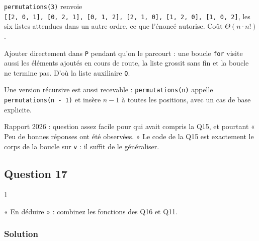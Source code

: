 \documentclass[11pt,a4paper]{article}
\begin{document}
\texttt{permutations(3)} renvoie \texttt{{[}{[}2,\allowbreak{}\ 0,\allowbreak{}\ 1{]}\allowbreak{},\allowbreak{}\ {[}0,\allowbreak{}\ 2,\allowbreak{}\ 1{]}\allowbreak{},\allowbreak{}\ {[}0,\allowbreak{}\ 1,\allowbreak{}\ 2{]}\allowbreak{},\allowbreak{}\ {[}2,\allowbreak{}\ 1,\allowbreak{}\ 0{]}\allowbreak{},\allowbreak{}\ {[}1,\allowbreak{}\ 2,\allowbreak{}\ 0{]}\allowbreak{},\allowbreak{}\ {[}1,\allowbreak{}\ 0,\allowbreak{}\ 2{]}\allowbreak{}{]}\allowbreak{}}, les six listes attendues dans un autre ordre, ce que l'énoncé autorise. Coût \(\Theta(n \cdot n!)\).

\begin{piege}

Ajouter directement dans \texttt{P} pendant qu'on le parcourt : une boucle \texttt{for} visite aussi les éléments ajoutés en cours de route, la liste grossit sans fin et la boucle ne termine pas. D'où la liste auxiliaire \texttt{Q}.

\end{piege}

\begin{methode}

Une version récursive est aussi recevable : \texttt{permutations(n)} appelle \texttt{permutations(\allowbreak{}n\ -\ 1)\allowbreak{}} et insère \(n - 1\) à toutes les positions, avec un cas de base explicite.

\end{methode}

\begin{jury}

Rapport 2026 : question assez facile pour qui avait compris la Q15, et pourtant « Peu de bonnes réponses ont été observées. » Le code de la Q15 est exactement le corps de la boucle sur \texttt{v} : il suffit de le généraliser.

\end{jury}

\hypertarget{question-17}{%
\subsection{Question 17}\label{question-17}}

\begin{indication}{1}

« En déduire » : combinez les fonctions des Q16 et Q11.

\end{indication}

\hypertarget{solution-16}{%
\subsubsection{Solution}\label{solution-16}}
\end{document}
